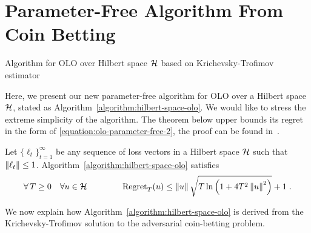 \section{Parameter-Free Algorithm From Coin Betting}
\label{section:algorithms}

\begin{algorithm}[t]
\caption{Algorithm for OLO over Hilbert space $\mathcal{H}$ based on Krichevsky-Trofimov estimator
\label{algorithm:hilbert-space-olo}}
\begin{algorithmic}[1]
{
\ENDFOR
}
\end{algorithmic}
\end{algorithm}

Here, we present our new parameter-free algorithm for \ac{OLO} over a Hilbert space $\mathcal{H}$, 
stated as Algorithm~\ref{algorithm:hilbert-space-olo}.  We would like to stress the extreme simplicity of the algorithm.
The theorem below upper
bounds its regret in the form of \eqref{equation:olo-parameter-free-2}, the proof can be found
in~\cite{Orabona-Pal-2016-parameter-free}.

\begin{theorem}
\label{theorem:hilbert-space-olo-regret}
Let $\{\ell_t\}_{t=1}^\infty$ be any sequence of loss vectors
in a Hilbert space $\mathcal{H}$ such that $\left\|{\ell_t}\right\| \le 1$.
Algorithm~\ref{algorithm:hilbert-space-olo} satisfies
$$
\forall \, T \ge 0 \quad
\forall u \in \mathcal{H} \qquad \qquad
\operatorname{Regret}_T(u) \le \left\|{u}\right\| \sqrt{T \ln\left(1 + 4T^2 \left\|{u}\right\|^2 \right)} + 1 \;.
$$
\end{theorem}

We now explain how Algorithm~\ref{algorithm:hilbert-space-olo} is derived from the
Krichevsky-Trofimov solution to the adversarial coin-betting problem.

